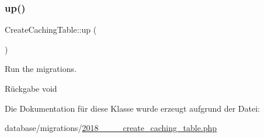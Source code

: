 \subsubsection{\texorpdfstring{up()}{up()}}
{\footnotesize\ttfamily Create\+Caching\+Table\+::up (\begin{DoxyParamCaption}{ }\end{DoxyParamCaption})}

Run the migrations.

\begin{DoxyReturn}{Rückgabe}
void 
\end{DoxyReturn}


Die Dokumentation für diese Klasse wurde erzeugt aufgrund der Datei\+:\begin{DoxyCompactItemize}
\item 
database/migrations/\hyperlink{2018__06__12__162233__create__caching__table_8php}{2018\+\_\+\_\+\_\+\_\+create\+\_\+caching\+\_\+table.\+php}\end{DoxyCompactItemize}

